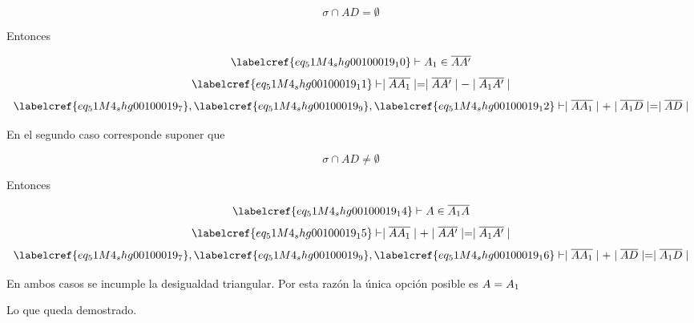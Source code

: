 \begin{equation} \label{eq_51M4_shg00100019_10}
	\sigma \cap AD = \emptyset
\end{equation}

Entonces 

\begin{equation} \label{eq_51M4_shg00100019_11}
	\labelcref{eq_51M4_shg00100019_10} \vdash A\textsubscript{1} \in \overline{AA'}
\end{equation}
\begin{equation} \label{eq_51M4_shg00100019_12}
	\labelcref{eq_51M4_shg00100019_11} \vdash \mid\overline{AA\textsubscript{1}}\mid = \mid\overline{AA'}\mid - \mid\overline{A\textsubscript{1}A'}\mid
\end{equation}
\begin{equation} \label{eq_51M4_shg00100019_13}
	\labelcref{eq_51M4_shg00100019_7}, \labelcref{eq_51M4_shg00100019_9}, \labelcref{eq_51M4_shg00100019_12} \vdash \mid\overline{AA\textsubscript{1}}\mid + \mid\overline{A\textsubscript{1}D}\mid = \mid\overline{AD}\mid
\end{equation}

En el segundo caso corresponde suponer que

\begin{equation} \label{eq_51M4_shg00100019_14}
	\sigma \cap AD \neq \emptyset
\end{equation}

Entonces 

\begin{equation} \label{eq_51M4_shg00100019_15}
	\labelcref{eq_51M4_shg00100019_14} \vdash A \in \overline{A\textsubscript{1}A}
\end{equation}
\begin{equation} \label{eq_51M4_shg00100019_16}
	\labelcref{eq_51M4_shg00100019_15} \vdash \mid\overline{AA\textsubscript{1}}\mid + \mid\overline{AA'}\mid = \mid\overline{A\textsubscript{1}A'}\mid
\end{equation}
\begin{equation} \label{eq_51M4_shg00100019_17}
	\labelcref{eq_51M4_shg00100019_7}, \labelcref{eq_51M4_shg00100019_9}, \labelcref{eq_51M4_shg00100019_16} \vdash \mid\overline{AA\textsubscript{1}}\mid + \mid\overline{AD}\mid = \mid\overline{A\textsubscript{1}D}\mid
\end{equation}

En ambos casos se incumple la desigualdad triangular. Por esta razón la única opción posible es $A = A\textsubscript{1}$

\vspace{1cm}
Lo que queda demostrado. \\\\\\
